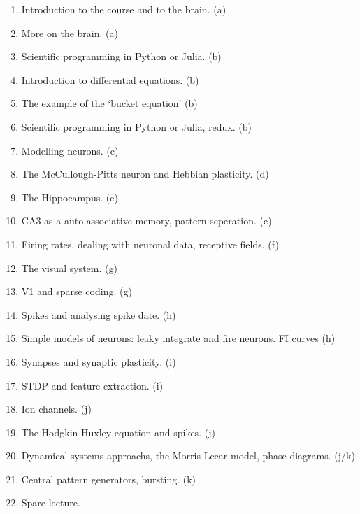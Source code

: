 \documentclass[11pt,a4paper]{scrartcl}
\begin{document}
\begin{enumerate}
\item Introduction to the course and to the brain. (a)
\item More on the brain. (a)

\item Scientific programming in Python or Julia. (b)
\item Introduction to differential equations. (b)

\item The example of the \lq{}bucket equation\rq{} (b)
\item Scientific programming in Python or Julia, redux. (b)

\item Modelling neurons. (c)
\item The McCullough-Pitts neuron and Hebbian plasticity. (d)

\item The Hippocampus. (e)
\item CA3 as a auto-associative memory, pattern seperation. (e)

\item Firing rates, dealing with neuronal data, receptive fields. (f)
\item The visual system. (g)

\item V1 and sparse coding. (g)
\item Spikes and analysing spike date. (h)

\item Simple models of neurons: leaky integrate and fire neurons. FI curves (h)
\item Synapses and synaptic plasticity. (i)

\item STDP and feature extraction. (i)
\item Ion channels. (j)

\item The Hodgkin-Huxley equation and spikes. (j)
\item Dynamical systems approachs, the Morris-Lecar model, phase diagrams. (j/k)

\item Central pattern generators, bursting. (k)
\item Spare lecture.

\end{enumerate}
\end{document}
